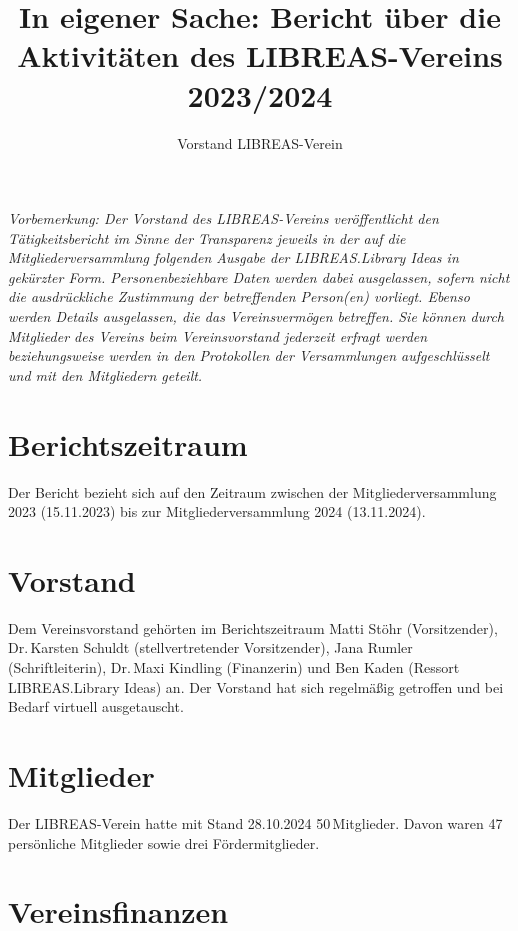 \documentclass[a4paper,
fontsize=11pt,
oneside,
numbers=noperiodatend,
parskip=half-,
bibliography=totoc,
final
]{scrartcl}
\title{\LARGE{In eigener Sache: Bericht über die Aktivitäten des LIBREAS-Vereins 2023/2024}}%
\author{Vorstand LIBREAS-Verein} %
\date{}
\begin{document}
\maketitle
\thispagestyle{fancyplain} 


\emph{Vorbemerkung: Der Vorstand des LIBREAS-Vereins veröffentlicht den
Tätigkeitsbericht im Sinne der Transparenz jeweils in der auf die
Mitgliederversammlung folgenden Ausgabe der LIBREAS.Library Ideas in
gekürzter Form. Personenbeziehbare Daten werden dabei ausgelassen,
sofern nicht die ausdrückliche Zustimmung der betreffenden Person(en)
vorliegt. Ebenso werden Details ausgelassen, die das Vereinsvermögen
betreffen. Sie können durch Mitglieder des Vereins beim Vereinsvorstand
jederzeit erfragt werden beziehungsweise werden in den Protokollen der
Versammlungen aufgeschlüsselt und mit den Mitgliedern geteilt.}

\section{Berichtszeitraum}\label{berichtszeitraum}

Der Bericht bezieht sich auf den Zeitraum zwischen der
Mitgliederversammlung 2023 (15.11.2023) bis zur Mitgliederversammlung
2024 (13.11.2024).

\section{Vorstand}\label{vorstand}

Dem Vereinsvorstand gehörten im Berichtszeitraum Matti Stöhr
(Vorsitzender), Dr.\,Karsten Schuldt (stellvertretender Vorsitzender),
Jana Rumler (Schriftleiterin), Dr.\,Maxi Kindling (Finanzerin) und Ben
Kaden (Ressort LIBREAS.Library Ideas) an. Der Vorstand hat sich
regelmäßig getroffen und bei Bedarf virtuell ausgetauscht.

\section{Mitglieder}\label{mitglieder}

Der LIBREAS-Verein hatte mit Stand 28.10.2024 50\,Mitglieder. Davon
waren 47 persönliche Mitglieder sowie drei Fördermitglieder.

\section{Vereinsfinanzen}\label{vereinsfinanzen}
\end{document}
